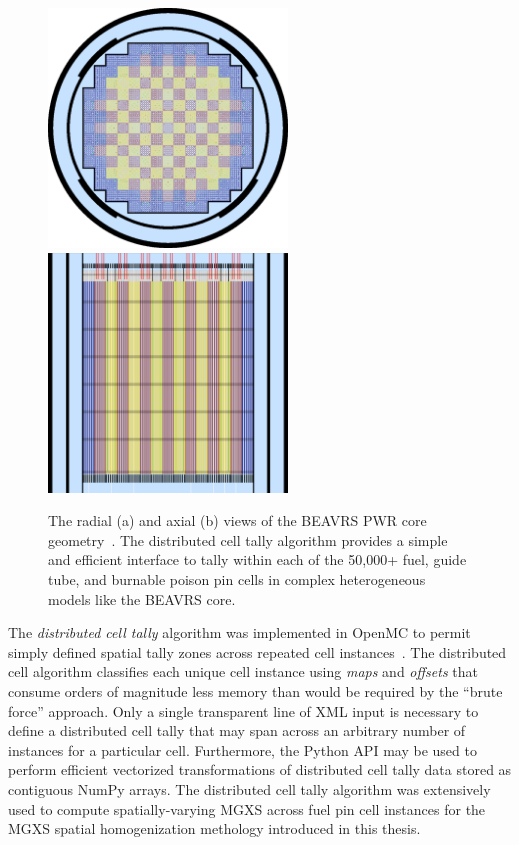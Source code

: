 \begin{figure}[h!]
  \centering
  \includegraphics[width=2.5in]{figures/workflow/openmc/core}\hspace{1cm}
  \includegraphics[width=2.5in]{figures/workflow/openmc/core_axial}
\caption[Radial and axial views of the BEAVRS core]{The radial (a) and axial (b) views of the BEAVRS \ac{PWR} core geometry~\cite{horelik2013beavrs}. The distributed cell tally algorithm provides a simple and efficient interface to tally within each of the 50,000+ fuel, guide tube, and burnable poison pin cells in complex heterogeneous models like the \ac{BEAVRS} core.}
\label{fig:beavrs}
\end{figure}

The \textit{distributed cell tally} algorithm was implemented in OpenMC to permit simply defined spatial tally zones across repeated cell instances~\cite{lax2014distribcell}. The distributed cell algorithm classifies each unique cell instance using \textit{maps} and \textit{offsets} that consume orders of magnitude less memory than would be required by the ``brute force'' approach. Only a single transparent line of \ac{XML} input is necessary to define a distributed cell tally that may span across an arbitrary number of instances for a particular cell. Furthermore, the Python \ac{API} may be used to perform efficient vectorized transformations of distributed cell tally data stored as contiguous NumPy arrays. The distributed cell tally algorithm was extensively used to compute spatially-varying \ac{MGXS} across fuel pin cell instances for the \ac{MGXS} spatial homogenization methology introduced in this thesis.

